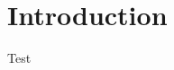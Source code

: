 \documentclass[a4paper,10pt]{article}
\date{\thedate}
\author{\theauthor}
\title{\assignment}
\begin{document}
\thispagestyle{empty}
\maketitle
\mbox{}

\section{Introduction}

Test \cite{tetris}

\printbibliography
\end{document}

